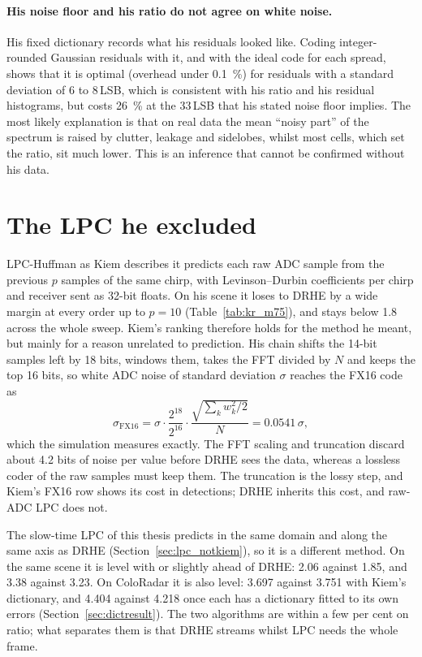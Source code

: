 \paragraph{His noise floor and his ratio do not agree on white noise.}
\label{sec:kr_fingerprint}
His fixed dictionary records what his residuals looked like. Coding
integer-rounded Gaussian residuals with it, and with the ideal code for each
spread, shows that it is optimal (overhead under \SI{0.1}{\percent}) for
residuals with a standard deviation of 6 to 8\,LSB, which is consistent with
his ratio and his residual histograms, but costs \SI{26}{\percent} at the
33\,LSB that his stated noise floor implies. The most likely explanation is
that on real data the mean ``noisy part'' of the spectrum is raised by clutter,
leakage and sidelobes, whilst most cells, which set the ratio, sit much lower.
This is an inference that cannot be confirmed without his data.

\section{The LPC he excluded}
\label{sec:kr_lpcraw}

LPC-Huffman as Kiem describes it predicts each raw ADC sample from the
previous $p$ samples of the same chirp, with Levinson--Durbin coefficients per
chirp and receiver sent as 32-bit floats. On his scene it loses to DRHE by a
wide margin at every order up to $p = 10$ (Table~\ref{tab:kr_m75}), and stays
below 1.8 across the whole sweep. Kiem's ranking therefore holds for the method
he meant, but mainly for a reason unrelated to prediction. His chain shifts the
14-bit samples left by 18 bits, windows them, takes the FFT divided by $N$ and
keeps the top 16 bits, so white ADC noise of standard deviation $\sigma$
reaches the FX16 code as
\begin{equation}
\label{eq:kr_noisemap}
\sigma_{\mathrm{FX16}} = \sigma \cdot \frac{2^{18}}{2^{16}} \cdot
\frac{\sqrt{\sum_k w_k^2 / 2}}{N} = 0.0541\,\sigma,
\end{equation}
which the simulation measures exactly. The FFT scaling and truncation discard
about 4.2 bits of noise per value before DRHE sees the data, whereas a lossless
coder of the raw samples must keep them. The truncation is the lossy step, and
Kiem's FX16 row shows its cost in detections; DRHE inherits this cost, and
raw-ADC LPC does not.

The slow-time LPC of this thesis predicts in the same domain and along the same
axis as DRHE (Section~\ref{sec:lpc_notkiem}), so it is a different method. On
the same scene it is level with or slightly ahead of DRHE: 2.06 against 1.85,
and 3.38 against 3.23. On ColoRadar it is also level: 3.697 against 3.751 with
Kiem's dictionary, and 4.404 against 4.218 once each has a dictionary fitted to
its own errors (Section~\ref{sec:dictresult}). The two algorithms are within a
few per cent on ratio; what separates them is that DRHE streams whilst LPC
needs the whole frame.

